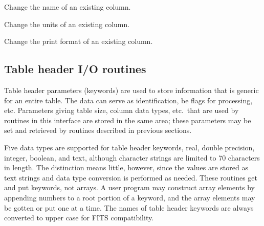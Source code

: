 \begin{callseq}
\end{callseq}

Change the name of an existing column.

\callseqtable

\begin{callseq}
\end{callseq}

Change the units of an existing column.

\callseqtable

\begin{callseq}
\end{callseq}

Change the print format of an existing column.

\callseqtable

\subsection{Table header I/O routines}

Table header parameters (keywords) are used to store information
that is generic for an entire table.
The data can serve as identification, be flags for processing, etc.
Parameters giving table size, column data types, etc.~that are used by
routines in this interface are  stored in the same area;
these parameters may be set and
retrieved by routines described in previous sections.

Five data types are supported for table header keywords,
real, double precision, integer, boolean, and text,
although character strings are limited to 70 characters in length.
The distinction means little, however,
since the values are stored as text strings
and data type conversion is performed as needed.
These routines get and put  keywords, not arrays.
A user program may construct array
elements by appending numbers to a root portion of a keyword,
and the array elements may be gotten or put one at a time.
The names of table header keywords
are always converted to upper case for FITS compatibility.

